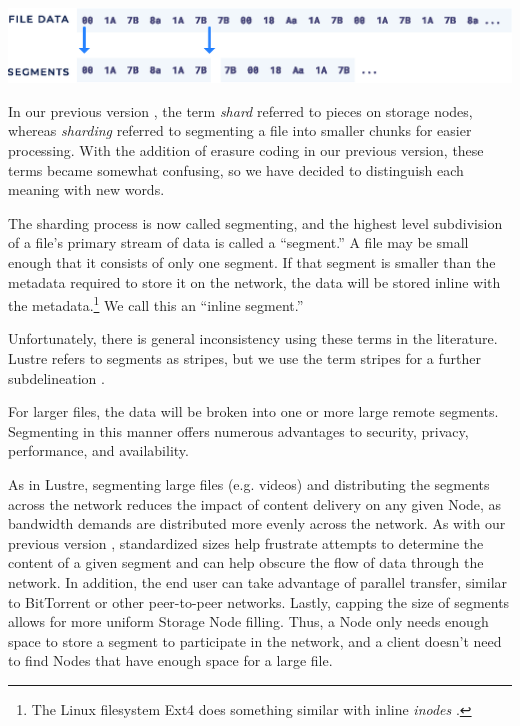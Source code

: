 \documentclass[8pt,fleqn,openany]{book}
\begin{document}
\begin{center}
\includegraphics[width=.9\textwidth]{images/stream-segment.eps}
\end{center}

In our previous version \cite{storj-v2}, the term {\em shard} referred to
pieces on storage nodes, whereas {\em sharding} referred to segmenting a file
into smaller chunks for easier processing. With the addition of erasure coding
in our previous version, these terms became somewhat confusing, so we have
decided to distinguish each meaning with new words.

The sharding process is now called segmenting, and the highest level
subdivision of a file's primary stream of data is called a ``segment.''
A file may be small enough that it consists of only one segment.
If that segment is smaller than the metadata required to store it on the
network, the data will be stored inline with the metadata.\footnote{
The Linux filesystem Ext4 does something
similar with inline {\em inodes} \cite{ext4-inline}.}
We call this an ``inline segment.''

Unfortunately, there is general inconsistency using these terms in the
literature. Lustre refers to segments as stripes, but we use the term stripes
for a further subdelineation \cite{lustre}.

For larger files, the data will be broken
into one or more large remote segments. Segmenting in this manner offers
numerous advantages to security, privacy, performance, and availability.

As in Lustre, segmenting large files (e.g. videos) and distributing the segments
across the network reduces the impact of content delivery on any
given Node, as
bandwidth demands are distributed more evenly across the network.
As with our previous version \cite{storj-v2},
standardized sizes help frustrate attempts to determine the content of a given
segment and can help obscure the flow of data through the network.
In addition, the end user can take advantage of parallel transfer, similar to
BitTorrent \cite{bittorrent} or other peer-to-peer networks.
Lastly, capping the size of segments
allows for more uniform Storage Node filling. Thus, a Node only needs enough
space to store a segment to participate in the network,
and a client doesn't need
to find Nodes that have enough space for a large file.
\end{document}
